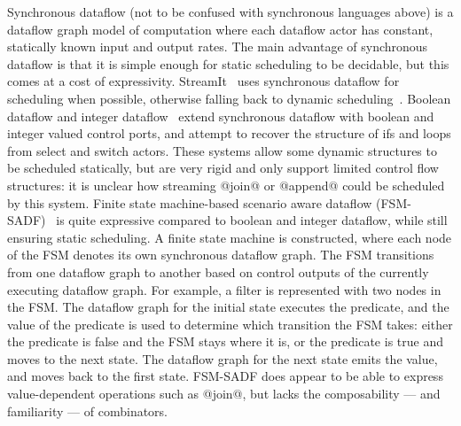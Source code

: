 Synchronous dataflow (not to be confused with synchronous languages above) is a dataflow graph model of computation where each dataflow actor has constant, statically known input and output rates.
The main advantage of synchronous dataflow is that it is simple enough for static scheduling to be decidable, but this comes at a cost of expressivity.
StreamIt~\cite{thies2002streamit} uses synchronous dataflow for scheduling when possible, otherwise falling back to dynamic scheduling~\cite{soule2013dynamic}.
Boolean dataflow and integer dataflow~\cite{buck1993scheduling,buck1994static} extend synchronous dataflow with boolean and integer valued control ports, and attempt to recover the structure of ifs and loops from select and switch actors.
These systems allow some dynamic structures to be scheduled statically, but are very rigid and only support limited control flow structures: it is unclear how streaming @join@ or @append@ could be scheduled by this system.
Finite state machine-based scenario aware dataflow (FSM-SADF)~\cite{stuijk2011scenario,van2015scenario} is quite expressive compared to boolean and integer dataflow, while still ensuring static scheduling.
A finite state machine is constructed, where each node of the FSM denotes its own synchronous dataflow graph.
The FSM transitions from one dataflow graph to another based on control outputs of the currently executing dataflow graph.
For example, a filter is represented with two nodes in the FSM.
The dataflow graph for the initial state executes the predicate, and the value of the predicate is used to determine which transition the FSM takes: either the predicate is false and the FSM stays where it is, or the predicate is true and moves to the next state.
The dataflow graph for the next state emits the value, and moves back to the first state.
FSM-SADF does appear to be able to express value-dependent operations such as @join@, but lacks the composability --- and familiarity --- of combinators.

% 



